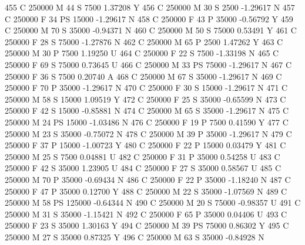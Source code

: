 \documentclass{article}
\begin{document}
\begin{Schunk}
\begin{Soutput}
455       C     250000   M  44         S   7500   1.37208    Y
456       C     250000   M  30         S   2500  -1.29617    N
457       C     250000   F  34        PS  15000  -1.29617    N
458       C     250000   F  43         P  35000  -0.56792    Y
459       C     250000   M  70         S  35000  -0.94371    N
460       C     250000   M  50         S  75000   0.53491    Y
461       C     250000   F  28         S  75000  -1.27876    N
462       C     250000   M  65         P   2500   1.47262    Y
463       C     250000   M  30         P   7500   1.19250    U
464       C     250000   F  22         S   7500  -1.33198    N
465       C     250000   F  69         S  75000   0.73645    U
466       C     250000   M  33        PS  75000  -1.29617    N
467       C     250000   F  36         S   7500   0.20740    A
468       C     250000   M  67         S  35000  -1.29617    N
469       C     250000   F  70         P  35000  -1.29617    N
470       C     250000   F  30         S  15000  -1.29617    N
471       C     250000   M  58         S  15000   1.09519    Y
472       C     250000   F  25         S  35000  -0.65599    N
473       C     250000   F  42         S  15000  -0.85881    N
474       C     250000   M  65         S  35000  -1.29617    N
475       C     250000   M  24        PS  15000  -1.03486    N
476       C     250000   F  19         P   7500   0.41590    Y
477       C     250000   M  23         S  35000  -0.75072    N
478       C     250000   M  39         P  35000  -1.29617    N
479       C     250000   F  37         P  15000  -1.00723    Y
480       C     250000   F  22         P  15000   0.03479    Y
481       C     250000   M  25         S   7500   0.04881    U
482       C     250000   F  31         P  35000   0.54258    U
483       C     250000   F  42         S  35000   1.23905    U
484       C     250000   F  27         S  35000   0.58567    U
485       C     250000   M  70         P  35000  -0.69434    N
486       C     250000   F  22         P  35000  -1.18240    N
487       C     250000   F  47         P  35000   0.12700    Y
488       C     250000   M  22         S  35000  -1.07569    N
489       C     250000   M  58        PS 125000  -0.64344    N
490       C     250000   M  20         S  75000  -0.98357    U
491       C     250000   M  31         S  35000  -1.15421    N
492       C     250000   F  65         P  35000   0.04406    U
493       C     250000   F  23         S  35000   1.30163    Y
494       C     250000   M  39        PS  75000   0.86302    Y
495       C     250000   M  27         S  35000   0.87325    Y
496       C     250000   M  63         S  35000  -0.84928    N

\end{Soutput}
\end{Schunk}
\end{document}
